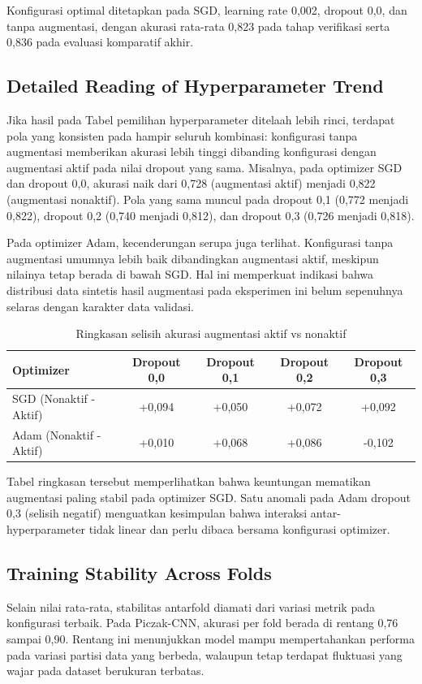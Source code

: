 \documentclass[10pt,a4paper]{jurnalvarian}
\let\LaTeXsubsection\subsection
\def\subsection{\setlength{\leftskip}{0.6cm}\LaTeXsubsection}
\begin{document}
Konfigurasi optimal ditetapkan pada SGD, learning rate 0,002, dropout 0,0, dan tanpa augmentasi, dengan akurasi rata-rata 0,823 pada tahap verifikasi serta 0,836 pada evaluasi komparatif akhir.

\subsection{Detailed Reading of Hyperparameter Trend}
Jika hasil pada Tabel pemilihan hyperparameter ditelaah lebih rinci, terdapat pola yang konsisten pada hampir seluruh kombinasi: konfigurasi tanpa augmentasi memberikan akurasi lebih tinggi dibanding konfigurasi dengan augmentasi aktif pada nilai dropout yang sama. Misalnya, pada optimizer SGD dan dropout 0,0, akurasi naik dari 0,728 (augmentasi aktif) menjadi 0,822 (augmentasi nonaktif). Pola yang sama muncul pada dropout 0,1 (0,772 menjadi 0,822), dropout 0,2 (0,740 menjadi 0,812), dan dropout 0,3 (0,726 menjadi 0,818).

Pada optimizer Adam, kecenderungan serupa juga terlihat. Konfigurasi tanpa augmentasi umumnya lebih baik dibandingkan augmentasi aktif, meskipun nilainya tetap berada di bawah SGD. Hal ini memperkuat indikasi bahwa distribusi data sintetis hasil augmentasi pada eksperimen ini belum sepenuhnya selaras dengan karakter data validasi.

\begin{table}[H]
\centering
\fontsize{8pt}{10pt}\selectfont
\caption{Ringkasan selisih akurasi augmentasi aktif vs nonaktif}
\begin{tabular}{lcccc}
\hline
Optimizer & Dropout 0,0 & Dropout 0,1 & Dropout 0,2 & Dropout 0,3 \\
\hline
SGD (Nonaktif - Aktif) & +0,094 & +0,050 & +0,072 & +0,092 \\
Adam (Nonaktif - Aktif) & +0,010 & +0,068 & +0,086 & -0,102 \\
\hline
\end{tabular}
\end{table}

Tabel ringkasan tersebut memperlihatkan bahwa keuntungan mematikan augmentasi paling stabil pada optimizer SGD. Satu anomali pada Adam dropout 0,3 (selisih negatif) menguatkan kesimpulan bahwa interaksi antar-hyperparameter tidak linear dan perlu dibaca bersama konfigurasi optimizer.

\subsection{Training Stability Across Folds}
Selain nilai rata-rata, stabilitas antarfold diamati dari variasi metrik pada konfigurasi terbaik. Pada Piczak-CNN, akurasi per fold berada di rentang 0,76 sampai 0,90. Rentang ini menunjukkan model mampu mempertahankan performa pada variasi partisi data yang berbeda, walaupun tetap terdapat fluktuasi yang wajar pada dataset berukuran terbatas.
\end{document}
